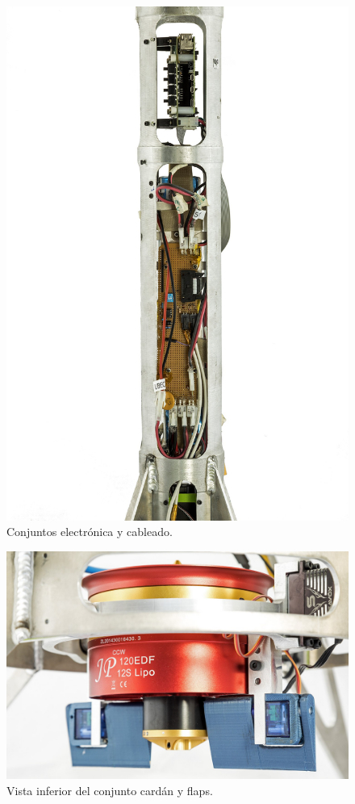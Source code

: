 \begin{figure}[htb]
    \centering
    \includegraphics[width=\linewidth]{fig/hq/electronics.jpg}
    \caption{Conjuntos electrónica y cableado.}
    \label{fig:hq/electronics}
\end{figure}

\begin{figure}[htb]
    \centering
    \includegraphics[width=\linewidth]{fig/hq/flaps.jpg}
    \caption{Vista inferior del conjunto cardán y flaps.}
    \label{fig:hq/flaps}
\end{figure}

